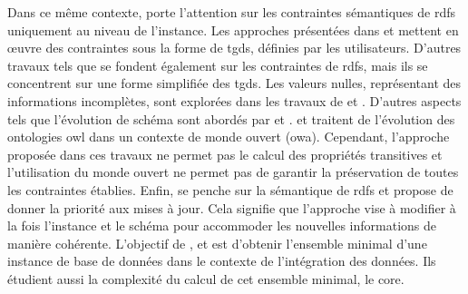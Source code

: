 Dans ce même contexte, \cite{goasdoueEfficientQueryAnswering2013} porte l'attention sur les contraintes sémantiques de \gls{rdfs} uniquement au niveau de l'instance.
Les approches présentées dans \cite{flourisFormalFoundationsRDF2013} et \cite{chabinUsingGraphGrammar2019} mettent en œuvre des contraintes sous la forme de \glspl{tgd}, définies par les utilisateurs.
D'autres travaux tels que \cite{halfed-ferrariRDFUpdatesConstraints2017} se fondent également sur les contraintes de \gls{rdfs}, mais ils se concentrent sur une forme simplifiée des \glspl{tgd}.
Les valeurs nulles, représentant des informations incomplètes, sont explorées dans les travaux de \cite{halfed-ferrariRDFUpdatesConstraints2017} et \cite{chabinUsingGraphGrammar2019}.
D'autres aspects tels que l'évolution de schéma sont abordés par \cite{flourisFormalFoundationsRDF2013} et \cite{goasdoueEfficientQueryAnswering2013}.
\cite{mahfoudhAdaptationOntologiesAvec2015} et \cite{mahfoudhAlgebraicGraphTransformations2015} traitent de l'évolution des ontologies \gls{owl} dans un contexte de monde ouvert (\acs{owa}).
Cependant, l'approche proposée dans ces travaux ne permet pas le calcul des propriétés transitives et l'utilisation du monde ouvert ne permet pas de garantir la préservation de toutes les contraintes établies.
Enfin, \cite{chabinUsingGraphGrammar2019} se penche sur la sémantique de \gls{rdfs} et propose de donner la priorité aux mises à jour.
Cela signifie que l'approche vise à modifier à la fois l'instance et le schéma pour accommoder les nouvelles informations de manière cohérente.
L'objectif de \cite{faginDataExchangeGetting2005}, \cite{gottlobComputingCoresData2005} et \cite{pichlerComplexityEvaluatingTuple2011} est d'obtenir l'ensemble minimal d'une instance de base de données dans le contexte de l'intégration des données.
Ils étudient aussi la complexité du calcul de cet ensemble minimal, le \gls{core}.

